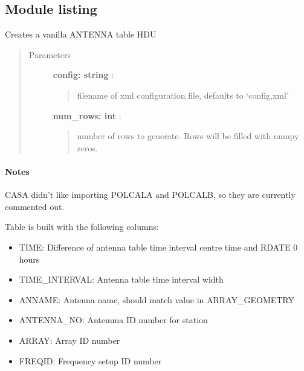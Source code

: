 \documentclass[letterpaper,10pt,english]{sphinxmanual}
\begin{document}
\subsection{Module listing}
\label{index:module-listing}

\begin{fulllineitems}
\label{index:pyFitsidi.make_antenna}
Creates a vanilla ANTENNA table HDU
\begin{quote}\begin{description}
\item[{Parameters }] \leavevmode
\textbf{config: string} :
\begin{quote}

filename of xml configuration file, defaults to `config,xml'
\end{quote}

\textbf{num\_rows: int} :
\begin{quote}

number of rows to generate. Rows will be filled with numpy zeros.
\end{quote}

\end{description}\end{quote}
\paragraph{Notes}

CASA didn't like importing POLCALA and POLCALB, so they are currently commented out.

Table is built with the following columns:
\begin{itemize}
\item {} 
TIME: Difference of antenna table time interval centre time and RDATE 0 hours

\item {} 
TIME\_INTERVAL: Antenna table time interval width

\item {} 
ANNAME: Antenna name, should match value in ARRAY\_GEOMETRY

\item {} 
ANTENNA\_NO: Antemma ID number for station

\item {} 
ARRAY:    Array ID number

\item {} 
FREQID:   Frequency setup ID number


\end{itemize}
\end{fulllineitems}
\end{document}
